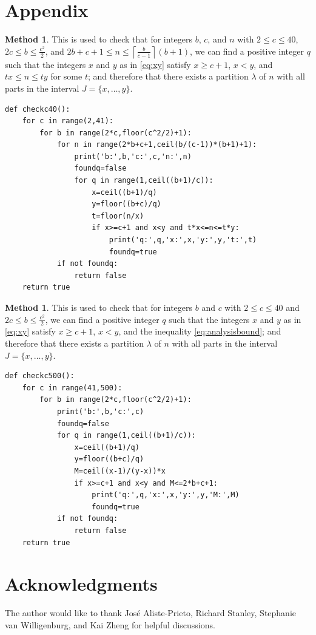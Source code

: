 \documentclass[12pt]{amsart}  %
\theoremstyle{definition}
\newtheorem{method}[theorem]{Method}
\theoremstyle{remark}
\numberwithin{equation}{section}
\begin{document}
\section{Appendix}\label{sec:appendix}

\begin{method}\label{method:40} This is used to check that for integers $b$, $c$, and $n$ with $2\leq c\leq 40$, $2c\leq b\leq\frac{c^2}2$, and $2b+c+1\leq n\leq\left\lceil\frac b{c-1}\right\rceil(b+1)$, we can find a positive integer $q$ such that the integers $x$ and $y$ as in \eqref{eq:xy} satisfy $x\geq c+1$, $x<y$, and $tx\leq n\leq ty$ for some $t$; and therefore that there exists a partition $\lambda$ of $n$ with all parts in the interval $J=\{x,\ldots,y\}$.
\begin{lstlisting}
def checkc40():
	for c in range(2,41):
		for b in range(2*c,floor(c^2/2)+1):
			for n in range(2*b+c+1,ceil(b/(c-1))*(b+1)+1):
				print('b:',b,'c:',c,'n:',n)
				foundq=false
				for q in range(1,ceil((b+1)/c)):
					x=ceil((b+1)/q)
					y=floor((b+c)/q)
					t=floor(n/x)
					if x>=c+1 and x<y and t*x<=n<=t*y:
						print('q:',q,'x:',x,'y:',y,'t:',t)
						foundq=true
			if not foundq:
				return false
	return true
\end{lstlisting}
\end{method}

\begin{method}\label{method:500} This is used to check that for integers $b$ and $c$ with $2\leq c\leq 40$ and $2c\leq b\leq\frac{c^2}2$, we can find a positive integer $q$ such that the integers $x$ and $y$ as in \eqref{eq:xy} satisfy $x\geq c+1$, $x<y$, and the inequality \eqref{eq:analysisbound}; and therefore that there exists a partition $\lambda$ of $n$ with all parts in the interval $J=\{x,\ldots,y\}$.
\begin{lstlisting} 
def checkc500():
	for c in range(41,500):
		for b in range(2*c,floor(c^2/2)+1):
			print('b:',b,'c:',c)
			foundq=false
			for q in range(1,ceil((b+1)/c)):
				x=ceil((b+1)/q)
				y=floor((b+c)/q)
				M=ceil((x-1)/(y-x))*x
				if x>=c+1 and x<y and M<=2*b+c+1:
					print('q:',q,'x:',x,'y:',y,'M:',M)
					foundq=true
			if not foundq:
				return false
	return true

\end{lstlisting}
\end{method}

\section{Acknowledgments}
The author would like to thank Jos\'e Aliste-Prieto, Richard Stanley, Stephanie van Willigenburg, and Kai Zheng for helpful discussions.
\end{document}
